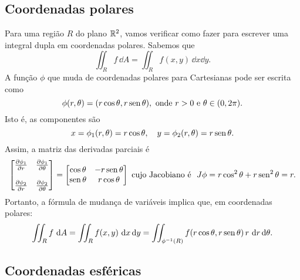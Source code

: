 \documentclass[../livro.tex]{subfiles}  %
\begin{document}
\subsection{Coordenadas polares}

Para uma região $R$ do plano $\mathbb{R}^2$, vamos verificar como fazer para escrever uma integral dupla em coordenadas polares. Sabemos que
\[
\iint_R f \, \dd A = \iint_R f(x,y) \, \dd x \dd y.
\] A função $\phi$ que muda de coordenadas polares para Cartesianas pode ser escrita como
\[
\phi (r, \theta) = (r\cos \theta, r \operatorname{sen} \theta), \text{ onde } r> 0 \text{ e } \theta \in (0,2\pi).
\] Isto é, as componentes são
\[
x = \phi_1 (r, \theta) = r\cos \theta, \quad y = \phi_2 (r, \theta) = r \operatorname{sen} \theta.
\] Assim, a matriz das derivadas parciais é
\[
\begin{bmatrix}
\frac{\partial \phi_1}{\partial r} & \frac{\partial \phi_1}{\partial \theta} \\
& \\
\frac{\partial \phi_2}{\partial r} & \frac{\partial \phi_2}{\partial \theta} \\
\end{bmatrix} = 
\begin{bmatrix}
\cos \theta & -r \operatorname{sen} \theta \\
\operatorname{sen} \theta & r \cos \theta \\
\end{bmatrix}
 \text{ cujo Jacobiano é } \ J\phi = r \cos^2 \theta + r \operatorname{sen}^2 \theta = r. 
\] Portanto, a fórmula de mudança de variáveis implica que, em coordenadas polares:
\[
\iint_R f \, \, \mathrm{d} A = \iint_R f(x,y) \, \, \mathrm{d} x \, \mathrm{d} y = \iint_{\phi^{-1}(R)} f(r\cos \theta, r\operatorname{sen} \theta) \, r \, \, \mathrm{d} r \, \mathrm{d} \theta.
\]


\subsection{Coordenadas esféricas}
\end{document}
